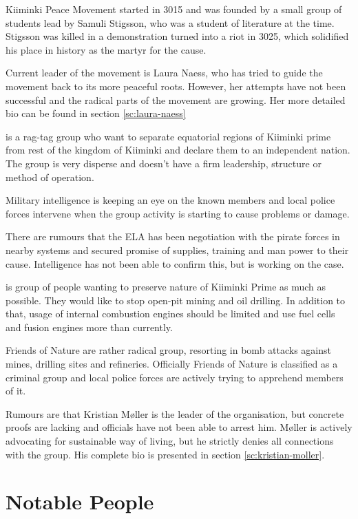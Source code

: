 \documentclass{tufte-book}
\begin{document}
Kiiminki Peace Movement started in 3015 and was founded by a small group of
students lead by Samuli Stigsson, who was a student of literature at the time.
Stigsson was killed in a demonstration turned into a riot in 3025, which
solidified his place in history as the martyr for the cause.

Current leader of the movement is Laura Naess, who has tried to guide the
movement back to its more peaceful roots. However, her attempts have not been
successful and the radical parts of the movement are growing. Her more
detailed bio can be found in section \ref{sc:laura-naess}

 is a rag-tag group who want to
separate equatorial regions of Kiiminki prime from rest of the kingdom of
Kiiminki and declare them to an independent nation. The group is very
disperse and doesn't have a firm leadership, structure or method of operation.

Military intelligence is keeping an eye on the known members and local police
forces intervene when the group activity is starting to cause problems or
damage.

There are rumours that the ELA has been negotiation with the pirate forces in
nearby systems and secured promise of supplies, training and man power to
their cause. Intelligence has not been able to confirm this, but is working
on the case.

 is group of people wanting to preserve nature
of Kiiminki Prime as much as possible. They would like to stop open-pit mining
and oil drilling. In addition to that, usage of internal combustion engines
should be limited and use fuel cells and fusion engines more than currently.

Friends of Nature are rather radical group, resorting in bomb attacks against
mines, drilling sites and refineries. Officially Friends of Nature is
classified as a criminal group and local police forces are actively trying to
apprehend members of it.

Rumours are that Kristian M\o ller is the leader of the organisation, but
concrete proofs are lacking and officials have not been able to arrest him.
M\o ller is actively advocating for sustainable way of living, but he
strictly denies all connections with the group. His complete bio is presented
in section \ref{sc:kristian-moller}.

\chapter{Notable People}
\label{ch:notable-people}
\end{document}
